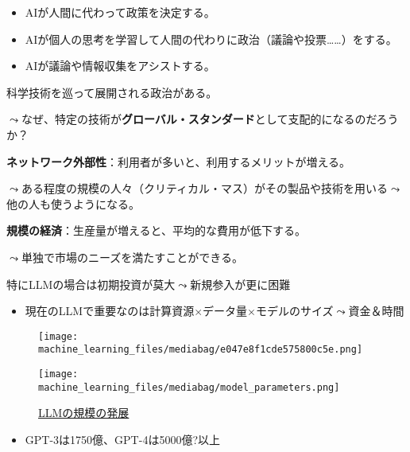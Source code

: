 \documentclass[
  xelatex,
  ja=standard]{bxjsarticle}
\providecommand{\tightlist}{%
  \setlength{\itemsep}{0pt}\setlength{\parskip}{0pt}}\usepackage{longtable,booktabs,array}
\begin{document}
\begin{itemize}
\tightlist
\item
  AIが人間に代わって政策を決定する。
\item
  AIが個人の思考を学習して人間の代わりに政治（議論や投票\ldots\ldots）をする。
\item
  AIが議論や情報収集をアシストする。
\end{itemize}

科学技術を巡って展開される政治がある。

\(\leadsto\)なぜ、特定の技術が\textbf{グローバル・スタンダード}として支配的になるのだろうか？

\textbf{ネットワーク外部性}：利用者が多いと、利用するメリットが増える。

\(\leadsto\)ある程度の規模の人々（クリティカル・マス）がその製品や技術を用いる\(\leadsto\)他の人も使うようになる。

\textbf{規模の経済}：生産量が増えると、平均的な費用が低下する。

\(\leadsto\)単独で市場のニーズを満たすことができる。

特にLLMの場合は初期投資が莫大\(\leadsto\)新規参入が更に困難

\begin{itemize}
\tightlist
\item
  現在のLLMで重要なのは計算資源\(\times\)データ量\(\times\)モデルのサイズ\(\leadsto\)資金＆時間
\end{itemize}

\begin{figure}[htpb]

{\centering \texttt{[image: machine\_learning\_files/mediabag/e047e8f1cde575800c5e.png]}

}

\caption{\citet{kaplan2020}}

\end{figure}

\begin{figure}[htpb]

{\centering \texttt{[image: machine\_learning\_files/mediabag/model\_parameters.png]}

}

\caption{\href{https://huggingface.co/learn/nlp-course/ja/chapter1/4?fw=pt}{LLMの規模の発展}}

\end{figure}

\begin{itemize}
\tightlist
\item
  GPT-3は1750億、GPT-4は5000億?以上
\end{itemize}
\end{document}
